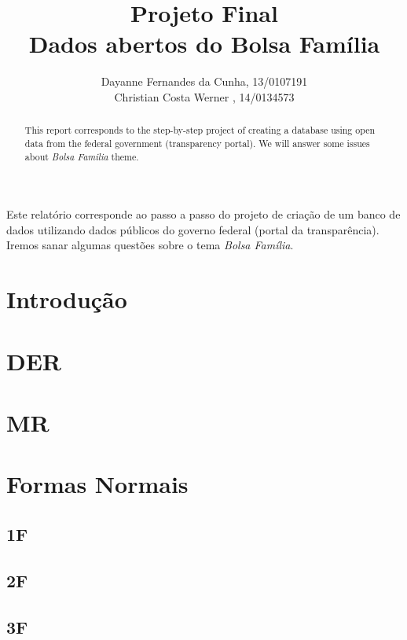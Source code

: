 \documentclass[12pt]{article}
\title{Projeto Final\\ 
	Dados abertos do Bolsa Família}
\author{Dayanne Fernandes da Cunha, 13/0107191\\
	 Christian Costa Werner ,  14/0134573
}
\begin{document}
 
	\maketitle
	
	\begin{abstract}
		This report corresponds to the step-by-step project of creating a database using open data from the federal government (transparency portal). We will answer some issues about \textit{Bolsa Familia} theme.
	\end{abstract}
	
	\begin{resumo} 
		Este relatório corresponde ao passo a passo do projeto de criação de um banco de dados utilizando dados públicos do governo federal (portal da transparência). Iremos sanar algumas questões sobre o tema \textit{Bolsa Família}.
	\end{resumo}
	
	\tableofcontents
	\newpage 
	
	\section{Introdução}
	\label{sec:intro}
	
	\section{DER}
	\label{sec:der}
	
	\section{MR} 
	\label{sec:mr}

	\section{Formas Normais}
	\label{sec:fnormais}
	
	\subsection{1F}
	\label{sec:1f}
	
	\subsection{2F}
	\label{sec:2f}
	
	\subsection{3F}
	\label{sec:3f}
	
\end{document}
